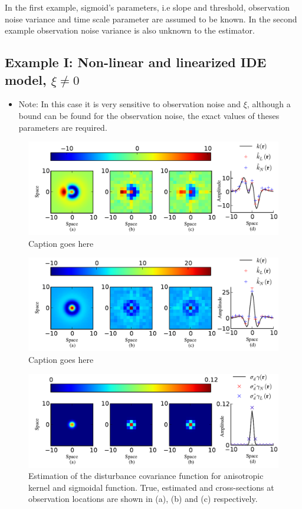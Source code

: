 \documentclass[10pt,twocolumn,twoside]{IEEEtran}
\begin{document}
In the first example, sigmoid's parameters, i.e slope and threshold, observation noise variance and time scale parameter are assumed to be known. In the second example observation noise variance is also unknown to the estimator.
\subsection{Example I: Non-linear and linearized IDE model, $\xi\neq 0$}
\begin{itemize}
\item Note: In this case it is very sensitive to observation noise and $\xi$, although a bound can be found for the observation noise, the exact values of theses parameters are required.
\end{itemize}
 
\begin{figure}[ht]
	\centering
		\includegraphics[scale=1]{./Graph/AnisoKernelIEEE1.pdf}
	\caption{Caption goes here}
	\label{fig:label1}
\end{figure}

\begin{figure}[ht]
	\centering
		\includegraphics[scale=1]{./Graph/IsoKernelIEEE.pdf}
	\caption{Caption goes here}
	\label{fig:label2}
\end{figure}  

\begin{figure}[ht]
	\centering
		\includegraphics[scale=1]{./Graph/DisturbanceWidthEstimation.pdf}
	\caption{Estimation of the disturbance covariance function for anisotropic kernel and sigmoidal function. True, estimated and cross-sections at observation locations are shown in (a), (b) and (c) respectively.}
	\label{fig:label3}
\end{figure}
\end{document}
